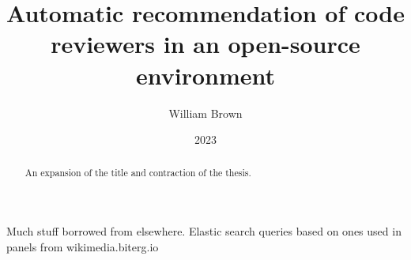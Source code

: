 \documentclass[bsc]{abdnthesis}
\title{Automatic recommendation of code reviewers in an open-source environment}
\author{William Brown}
\date{2023}
\begin{document}

\maketitle
\makedeclaration


\begin{abstract}
  An expansion of the title and contraction of the thesis.
\end{abstract}

\begin{acknowledgements}
  Much stuff borrowed from elsewhere.
  Elastic search queries based on ones used in panels from wikimedia.biterg.io
\end{acknowledgements}


\tableofcontents


%









% 
% 
% 
% 
% 

\appendix
% 


\end{document}
